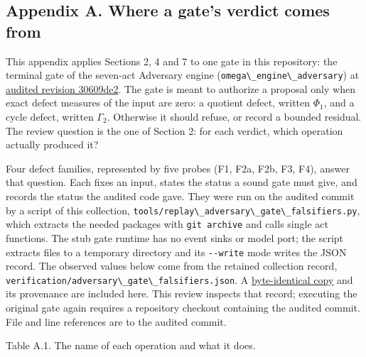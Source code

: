 \documentclass[
  11pt,
]{article}
\newcommand{\passthrough}[1]{#1}
\begin{document}
\hypertarget{appendix-a.-where-a-gates-verdict-comes-from}{%
\subsection{Appendix A. Where a gate's verdict comes
from}\label{appendix-a.-where-a-gates-verdict-comes-from}}

This appendix applies Sections 2, 4 and 7 to one gate in this
repository: the terminal gate of the seven-act Adversary engine
(\passthrough{\lstinline!omega\_engine\_adversary!}) at
\href{https://github.com/dbccpage/the_symbol_game/commit/30609de2c3928238715375a9bac608256fa381d8}{audited
revision 30609de2}. The gate is meant to authorize a proposal only when
exact defect measures of the input are zero: a quotient defect, written
\(\Phi_1\), and a cycle defect, written \(\Gamma_2\). Otherwise it
should refuse, or record a bounded residual. The review question is the
one of Section 2: for each verdict, which operation actually produced
it?

Four defect families, represented by five probes (F1, F2a, F2b, F3, F4),
answer that question. Each fixes an input, states the status a sound
gate must give, and records the status the audited code gave. They were
run on the audited commit by a script of this collection,
\passthrough{\lstinline!tools/replay\_adversary\_gate\_falsifiers.py!},
which extracts the needed packages with
\passthrough{\lstinline!git archive!} and calls single act functions.
The stub gate runtime has no event sinks or model port; the script
extracts files to a temporary directory and its
\passthrough{\lstinline!--write!} mode writes the JSON record. The
observed values below come from the retained collection record,
\passthrough{\lstinline!verification/adversary\_gate\_falsifiers.json!}. A
\href{docs/historical_evidence/adversary_gate_falsifiers.json}{byte-identical
copy} and its provenance are included here. This review inspects that
record; executing the original gate again requires a repository checkout
containing the audited commit. File and line references are to the
audited commit.

Table A.1. The name of each operation and what it does.
\end{document}
